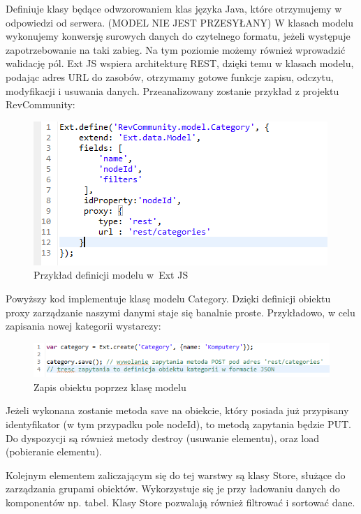 Definiuje klasy będące odwzorowaniem klas języka Java, które otrzymujemy w odpowiedzi od serwera. (MODEL NIE JEST PRZESYŁANY) W klasach modelu wykonujemy konwersję surowych danych do czytelnego formatu, jeżeli występuje zapotrzebowanie na taki zabieg. Na tym poziomie możemy również wprowadzić walidację pól. Ext JS wspiera architekturę REST, dzięki temu w klasach modelu, podając adres URL do zasobów, otrzymamy gotowe funkcje zapisu, odczytu, modyfikacji i usuwania danych. Przeanalizowany zostanie przykład z projektu RevCommunity:

\begin{figure}[H]
	\centering
	\includegraphics[width=\textwidth]{images/ext_model.png}
	\caption{Przykład definicji modelu w~Ext JS}
\end{figure}

Powyższy kod implementuje klasę modelu Category. Dzięki definicji obiektu proxy zarządzanie naszymi danymi staje się banalnie proste. Przykładowo, w celu zapisania nowej kategorii wystarczy:

\begin{figure}[H]
	\centering
	\includegraphics[width=\textwidth]{images/save_model.png}
	\caption{Zapis obiektu poprzez klasę modelu}
\end{figure}

Jeżeli wykonana zostanie metoda save na obiekcie, który posiada już przypisany identyfikator (w tym przypadku pole nodeId), to metodą zapytania będzie PUT.
Do dyspozycji są również metody destroy (usuwanie elementu), oraz load (pobieranie elementu).

Kolejnym elementem zaliczającym się do tej warstwy są klasy Store, służące do zarządzania grupami obiektów. Wykorzystuje się je przy ładowaniu danych do komponentów np. tabel. 
Klasy Store pozwalają również filtrować i sortować dane.


